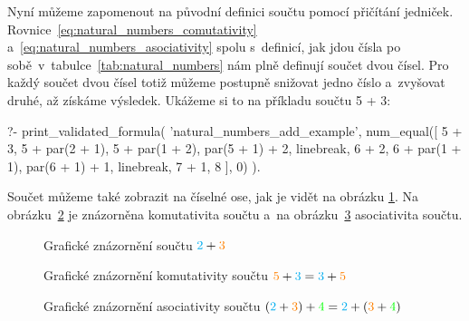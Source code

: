 Nyní můžeme zapomenout na původní definici součtu pomocí přičítání jedniček. Rovnice~\eqref{eq:natural_numbers_comutativity} a~\eqref{eq:natural_numbers_asociativity} spolu s~definicí, jak jdou čísla po sobě~v~tabulce~\ref{tab:natural_numbers} nám plně definují součet dvou čísel. Pro každý součet dvou čísel totiž můžeme postupně snižovat jedno číslo a~zvyšovat druhé, až získáme výsledek. Ukážeme si to na příkladu součtu 5 + 3:

\begin{prolog}
?-	print_validated_formula(
		'natural_numbers_add_example',
		num_equal([
			5 + 3,
			5 + par(2 + 1),
			5 + par(1 + 2),
			par(5 + 1) + 2,
			linebreak,
			6 + 2,
			6 + par(1 + 1),
			par(6 + 1) + 1,
			linebreak,
			7 + 1,
			8
		], 0)
	).
\end{prolog}

Součet můžeme také zobrazit na číselné ose, jak je vidět na obrázku \ref{img:soucet_ciselna_osa}. Na obrázku~\ref{img:komutativita_souctu_ciselna_osa} je znázorněna komutativita součtu a~na obrázku~\ref{img:asociativita_souctu_ciselna_osa} asociativita součtu.

\begin{figure}[!h]
\centering
{}
\caption{Grafické znázornění součtu \(\textcolor{cyan}{2} + \textcolor{orange}{3}\)}
\label{img:soucet_ciselna_osa}
\end{figure}

\begin{figure}[!h]
\centering
{}
\caption{Grafické znázornění komutativity součtu \(\textcolor{orange}{5} + \textcolor{cyan}{3} = \textcolor{cyan}{3} + \textcolor{orange}{5}\)}
\label{img:komutativita_souctu_ciselna_osa}
\end{figure}

\begin{figure}[!h]
\centering
{}
\caption{Grafické znázornění asociativity součtu \((\textcolor{cyan}{2} + \textcolor{orange}{3}) + \textcolor{green}{4} = \textcolor{cyan}{2} + (\textcolor{orange}{3} + \textcolor{green}{4})\)}
\label{img:asociativita_souctu_ciselna_osa}
\end{figure}


